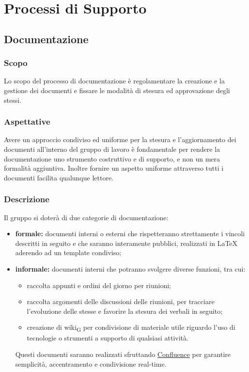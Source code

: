 \section{Processi di Supporto}
\label{supporto}
\subsection{Documentazione}
    \subsubsection{Scopo}
    Lo scopo del processo di documentazione è regolamentare la creazione e la gestione dei documenti e fissare le modalità di stesura ed approvazione degli stessi.
    \subsubsection{Aspettative}
    Avere un approccio condiviso ed uniforme per la stesura e l'aggiornamento dei documenti all'interno del gruppo di lavoro è fondamentale per rendere la documentazione uno strumento costruttivo e di supporto, e non un mera formalità aggiuntiva.
    Inoltre fornire un aspetto uniforme attraverso tutti i documenti facilita qualunque lettore.
    \subsubsection{Descrizione}
    Il gruppo \group si doterà di due categorie di documentazione:
    \begin{itemize}
        \item \textbf{formale: }documenti interni o esterni che rispetteranno strettamente i vincoli descritti in seguito e che saranno interamente pubblici, realizzati in \LaTeX{} aderendo ad un template condiviso;
        \item \textbf{informale: }documenti interni che potranno svolgere diverse funzioni, tra cui:
        \begin{itemize}
            \item  raccolta appunti e ordini del giorno per riunioni;
            \item  raccolta argomenti delle discussioni delle riunioni, per tracciare l'evoluzione delle stesse e favorire la stesura dei verbali in seguito;
            \item  creazione di \gls{wiki}\textsubscript{G} per condivisione di materiale utile riguardo l'uso di tecnologie o strumenti a supporto di qualsiasi attività.
        \end{itemize}
        Questi documenti saranno realizzati sfruttando \href{https://www.atlassian.com/software/confluence}{Confluence} per garantire semplicità, accentramento e condivisione real-time.

    \end{itemize}
